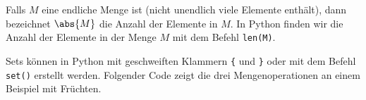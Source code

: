 \begin{itemize}
	      \begin{center}
	      \end{center}
\end{itemize}

Falls $M$ eine endliche Menge ist (nicht unendlich viele Elemente enthält), dann bezeichnet $\abs{M}$ die Anzahl der Elemente in $M$. In Python finden wir die Anzahl der Elemente in der Menge $M$ mit dem Befehl \lstinline|len(M)|.

\begin{myexample}
	Sets können in Python mit geschweiften Klammern \lstinline|{| und \lstinline|}| oder mit dem Befehl \lstinline|set()| erstellt werden. Folgender Code zeigt die drei Mengenoperationen an einem Beispiel mit Früchten.
	
\end{myexample}

